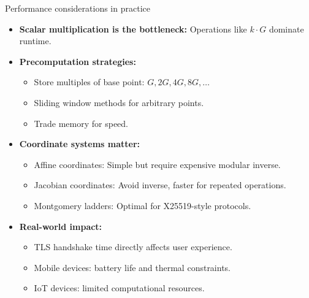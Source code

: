 \documentclass[aspectratio=169, lualatex, handout]{beamer}
\begin{document}
\begin{frame}{Performance considerations in practice}
	\begin{itemize}
		\item \textbf{Scalar multiplication is the bottleneck:} Operations like $k \cdot G$ dominate runtime.
		\item \textbf{Precomputation strategies:}
		      \begin{itemize}
			      \item Store multiples of base point: $G, 2G, 4G, 8G, \ldots$
			      \item Sliding window methods for arbitrary points.
			      \item Trade memory for speed.
		      \end{itemize}
		\item \textbf{Coordinate systems matter:}
		      \begin{itemize}
			      \item Affine coordinates: Simple but require expensive modular inverse.
			      \item Jacobian coordinates: Avoid inverse, faster for repeated operations.
			      \item Montgomery ladders: Optimal for X25519-style protocols.
		      \end{itemize}
		\item \textbf{Real-world impact:}
		      \begin{itemize}
			      \item TLS handshake time directly affects user experience.
			      \item Mobile devices: battery life and thermal constraints.
			      \item IoT devices: limited computational resources.
		      \end{itemize}
	\end{itemize}
\end{frame}
\end{document}
